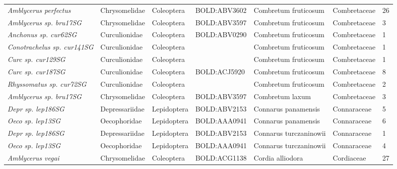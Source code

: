 \documentclass[11pt]{article}
\begin{document}
\begin{landscape}
\begin{longtable}{@{}lllllll@{}}
\textit{Amblycerus perfectus}                         & Chrysomelidae   & Coleoptera   & BOLD:ABV3602 & Combretum fruticosum               & Combretaceae     & 26    \\
\textit{Amblycerus sp. bru17SG}                       & Chrysomelidae   & Coleoptera   & BOLD:ABV3597 & Combretum fruticosum               & Combretaceae     & 3     \\
\textit{Anchonus sp. cur62SG}                         & Curculionidae   & Coleoptera   & BOLD:ABV0290 & Combretum fruticosum               & Combretaceae     & 1     \\
\textit{Conotrachelus sp. cur141SG}                   & Curculionidae   & Coleoptera   &              & Combretum fruticosum               & Combretaceae     & 1     \\
\textit{Curc sp. cur129SG}                            & Curculionidae   & Coleoptera   &              & Combretum fruticosum               & Combretaceae     & 1     \\
\textit{Curc sp. cur187SG}                            & Curculionidae   & Coleoptera   & BOLD:ACJ5920 & Combretum fruticosum               & Combretaceae     & 8     \\
\textit{Rhyssomatus sp. cur72SG}                      & Curculionidae   & Coleoptera   &              & Combretum fruticosum               & Combretaceae     & 2     \\
\textit{Amblycerus sp. bru17SG}                       & Chrysomelidae   & Coleoptera   & BOLD:ABV3597 & Combretum laxum                    & Combretaceae     & 3     \\
\textit{Depr sp. lep186SG}                            & Depressariidae  & Lepidoptera  & BOLD:ABV2153 & Connarus panamensis                & Connaraceae      & 5     \\
\textit{Oeco sp. lep13SG}                             & Oecophoridae    & Lepidoptera  & BOLD:AAA0941 & Connarus panamensis                & Connaraceae      & 6     \\
\textit{Depr sp. lep186SG}                            & Depressariidae  & Lepidoptera  & BOLD:ABV2153 & Connarus turczaninowii             & Connaraceae      & 1     \\
\textit{Oeco sp. lep13SG}                             & Oecophoridae    & Lepidoptera  & BOLD:AAA0941 & Connarus turczaninowii             & Connaraceae      & 4     \\
\textit{Amblycerus vegai}                             & Chrysomelidae   & Coleoptera   & BOLD:ACG1138 & Cordia alliodora                   & Cordiaceae       & 27    \\

\end{longtable}
\end{landscape}
\end{document}
